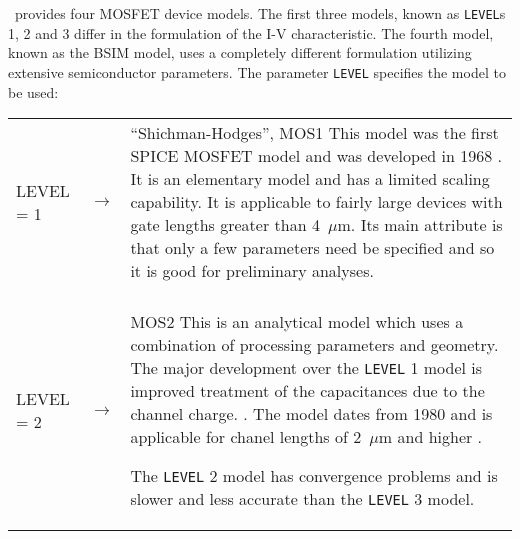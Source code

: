 \spice\ provides four MOSFET device models.  The first three
models, known as {\tt LEVEL}s 1, 2 and 3 differ in  the
formulation of the I-V characteristic.  The fourth model, known as
the BSIM model, uses a completely different formulation utilizing
extensive semiconductor parameters. The parameter {\tt LEVEL}
specifies the model to be used:
\\[0.2in]
\noindent\begin{tabular}{p{0.9in}p{0.2in}p{4in}}
         LEVEL = 1& $\rightarrow$ &  ``Shichman-Hodges'', MOS1\newline
                    This model was the first SPICE MOSFET model and
              was developed
              in 1968 \cite{shichman:hodges:68}.
              It is an elementary model and has a limited
              scaling capability.  It is applicable to fairly large
              devices with gate lengths greater than 4~$\mu$m.
              Its main attribute is that only a few parameters need
              be specified and so it is good for preliminary analyses.\\
              \\
         LEVEL = 2& $\rightarrow$ &  MOS2\newline
             This is an analytical model which uses a combination of
         processing parameters and geometry. The major development over
         the {\tt LEVEL} 1 model is improved treatment of the
         capacitances due to the channel charge.
         \cite{meyer:71,ward:dutton:78,oh:ward:80}.  The model dates
         from 1980 and is applicable for chanel lengths of 2~$\mu$m
         and higher \cite{vladimirescu:liu:80}.

             The {\tt LEVEL} 2 model has convergence problems and is slower and
         less accurate than the {\tt LEVEL} 3 model.
\end{tabular}
\vspace*{\fill}

